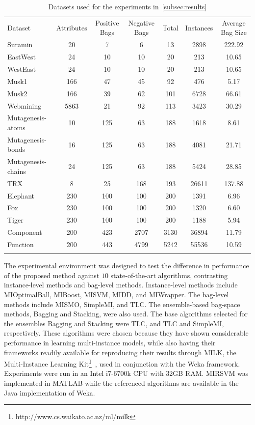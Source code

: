 \documentclass[preprint,12pt]{elsarticle}
\begin{document}
\begin{table}[t!]
\caption{Datasets used for the experiments in~\ref{subsec:results}}
\small
\label{tab:Dataset}
\begin{tabularx}{\textwidth}{l@{\extracolsep{\fill}}cccccc}
\hline\noalign{\smallskip}
Dataset & Attributes & Positive Bags & Negative Bags & Total & Instances & Average Bag Size\\
\noalign{\smallskip}\hline\noalign{\smallskip}
Suramin & 20 & 7 & 6 & 13 & 2898 &  222.92 \\ 
EastWest & 24 & 10 & 10 & 20 & 213 &  10.65  \\ 
WestEast & 24 & 10 & 10 & 20 & 213 &  10.65  \\ 
Musk1 & 166 & 47 & 45 & 92 & 476 &  5.17  \\ 
Musk2 & 166 & 39 & 62 & 101 & 6728 &  66.61  \\ 
Webmining & 5863 & 21 & 92 & 113 & 3423 &  30.29  \\ 
Mutagenesis-atoms & 10 & 125 & 63 & 188 & 1618 &  8.61  \\ 
Mutagenesis-bonds & 16 & 125 & 63 & 188 & 4081 &  21.71  \\ 
Mutagenesis-chains & 24 & 125 & 63 & 188 & 5424 &  28.85  \\ 
TRX & 8 & 25 & 168 & 193 & 26611 &  137.88 \\ 
Elephant & 230 & 100 & 100 & 200 & 1391 &  6.96 \\ 
Fox & 230 & 100 & 100 & 200 & 1320 &  6.60 \\ 
Tiger & 230 & 100 & 100 & 200 & 1188 &  5.94  \\ 
Component & 200 & 423 & 2707 & 3130 & 36894 &  11.79  \\ 
Function & 200 & 443 & 4799 & 5242 & 55536 &  10.59  \\ 
\noalign{\smallskip}\hline
\end{tabularx}
\end{table}

The experimental environment was designed to test the difference in performance of the proposed method against $10$ state-of-the-art algorithms, contrasting instance-level methods and bag-level methods. Instance-level methods include MIOptimalBall, MIBoost, MISVM, MIDD, and MIWrapper. The bag-level methods include MISMO, SimpleMI, and TLC. The ensemble-based bag-space methods, Bagging and Stacking, were also used. The base algorithms selected for the ensembles Bagging and Stacking were TLC, and TLC and SimpleMI, respectively. These algorithms were chosen because they have shown considerable performance in learning multi-instance models, while also having their frameworks readily available for reproducing their results through MILK, the Multi-Instance Learning Kit\footnote{http://www.cs.waikato.ac.nz/ml/milk}~\citep{Xu2003}, used in conjunction with the Weka framework. Experiments were run in an Intel i7-6700k CPU with 32GB RAM. MIRSVM was implemented in MATLAB while the referenced algorithms are available in the Java implementation of Weka.
\end{document}
